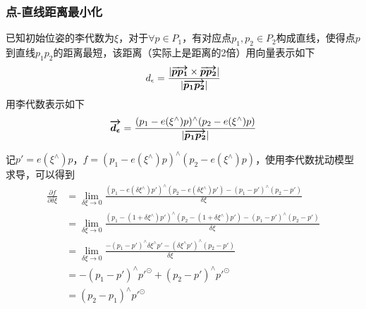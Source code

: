 \documentclass{ctexart}
\begin{document}
{	\subsubsection{点-直线距离最小化}
	已知初始位姿的李代数为$\xi$，对于$\forall p \in P_1$，有对应点$p_1,p_2 \in P_2$构成直线，使得点$p$到直线$p_1p_2$的距离最短，该距离（实际上是距离的2倍）用向量表示如下
	\begin{equation}
	d_{\epsilon} =
	\frac{|\boldmath\overrightarrow{p p_1}\unboldmath \times \boldmath\overrightarrow{p p_2}\unboldmath|}{|\boldmath\overrightarrow{p_1 p_2}\unboldmath|}
	\end{equation}
	用李代数表示如下
	\begin{equation}
	\boldmath\overrightarrow{d_{\epsilon}}\unboldmath =
	\frac{(p_1-e(\xi ^\wedge)p)^\wedge(p_2-e(\xi ^\wedge)p)}{|\boldmath\overrightarrow{p_1 p_2}\unboldmath|}
	\end{equation}
	\par 记$p'=e(\xi ^\wedge)p$，$f=(p_1-e(\xi ^\wedge)p) ^\wedge (p_2-e(\xi ^\wedge)p)$，使用李代数扰动模型求导，可以得到
	\begin{equation}
	\begin{split}
	\frac{\partial f}{\partial \delta \xi}
	&=
	\lim\limits_{\delta \xi \rightarrow 0}
	\frac{(p_1-e(\delta \xi ^\wedge) p') 
	^\wedge 
	(p_2-e(\delta \xi ^\wedge) p')
	-
	(p_1-p') ^\wedge (p_2-p')
	}{\delta \xi} \\
	&=
	\lim\limits_{\delta \xi \rightarrow 0}
	\frac{(p_1-(1+\delta \xi ^\wedge) p') 
		^\wedge 
		(p_2-(1+\delta \xi ^\wedge) p')
		-
		(p_1-p') ^\wedge (p_2-p')
	}{\delta \xi} \\
	&=
	\lim\limits_{\delta \xi \rightarrow 0}
	\frac{-(p_1-p')^\wedge\delta\xi^\wedge p'- (\delta\xi^\wedge p')^\wedge(p_2-p')}{\delta \xi} \\
	&=
	- (p_1-p')^\wedge p'^\odot + (p_2-p')^\wedge p'^\odot \\
	&=
	(p_2 - p_1)^\wedge p'^\odot
	\end{split}
	\end{equation}
	
}
\end{document}

